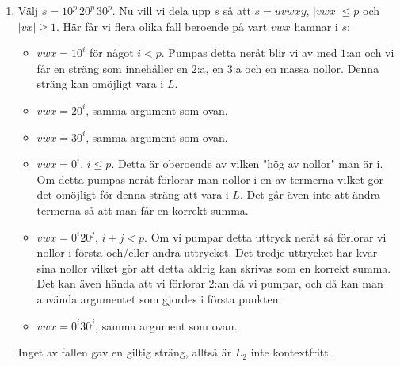 \documentclass{article}
\begin{document}
\begin{enumerate}[label=(\alph*)]
    \item 
        Välj $s = 10^p\,20^p\,30^p$. Nu vill vi dela upp $s$ så att $s=uvwxy$, $|vwx| \le p$ och $|vx| \ge 1$. Här får vi flera olika fall beroende på vart $vwx$ hamnar i $s$:
        \begin{itemize}
            \item $vwx=10^i$ för något $i < p$. Pumpas detta neråt blir vi av med $1$:an och vi får en sträng som innehåller en $2$:a, en $3$:a och en massa nollor. Denna sträng kan omöjligt vara i $L$.
            \item $vwx=20^i$, samma argument som ovan.
            \item $vwx=30^i$, samma argument som ovan.
            \item $vwx=0^i$, $i \le p$. Detta är oberoende av vilken "hög av nollor" man är i. Om detta pumpas neråt förlorar man nollor i en av termerna vilket gör det omöjligt för denna sträng att vara i $L$. Det går även inte att ändra termerna så att man får en korrekt summa. 
            \item $vwx=0^i20^j$, $i + j < p$. Om vi pumpar detta uttryck neråt så förlorar vi nollor i första och/eller andra uttrycket. Det tredje uttrycket har kvar sina nollor vilket gör att detta aldrig kan skrivas som en korrekt summa. Det kan även hända att vi förlorar $2$:an då vi pumpar, och då kan man använda argumentet som gjordes i första punkten.
            \item $vwx=0^i30^j$, samma argument som ovan.
        \end{itemize}
        Inget av fallen gav en giltig sträng, alltså är $L_2$ inte kontextfritt.
        
\end{enumerate}

\section{}
\end{document}
